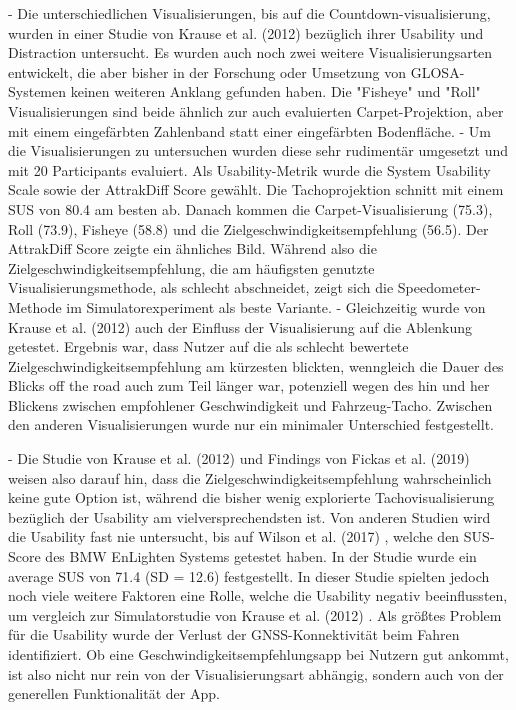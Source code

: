 - Die unterschiedlichen Visualisierungen, bis auf die Countdown-visualisierung, wurden in einer Studie von Krause et al. (2012) \cite{krause_traffic_2012} bezüglich ihrer Usability und Distraction untersucht. Es wurden auch noch zwei weitere Visualisierungsarten entwickelt, die aber bisher in der Forschung oder Umsetzung von GLOSA-Systemen keinen weiteren Anklang gefunden haben. Die "Fisheye" und "Roll" Visualisierungen sind beide ähnlich zur auch evaluierten Carpet-Projektion, aber mit einem eingefärbten Zahlenband statt einer eingefärbten Bodenfläche.
- Um die Visualisierungen zu untersuchen wurden diese sehr rudimentär umgesetzt und mit 20 Participants evaluiert. Als Usability-Metrik wurde die System Usability Scale sowie der AttrakDiff Score gewählt. Die Tachoprojektion schnitt mit einem SUS von 80.4 am besten ab. Danach kommen die Carpet-Visualisierung (75.3), Roll (73.9), Fisheye (58.8) und die Zielgeschwindigkeitsempfehlung (56.5). Der AttrakDiff Score zeigte ein ähnliches Bild. Während also die Zielgeschwindigkeitsempfehlung, die am häufigsten genutzte Visualisierungsmethode, als schlecht abschneidet, zeigt sich die Speedometer-Methode im Simulatorexperiment als beste Variante.
- Gleichzeitig wurde von Krause et al. (2012) \cite{krause_traffic_2012} auch der Einfluss der Visualisierung auf die Ablenkung getestet. Ergebnis war, dass Nutzer auf die als schlecht bewertete Zielgeschwindigkeitsempfehlung am kürzesten blickten, wenngleich die Dauer des Blicks off the road auch zum Teil länger war, potenziell wegen des hin und her Blickens zwischen empfohlener Geschwindigkeit und Fahrzeug-Tacho. Zwischen den anderen Visualisierungen wurde nur ein minimaler Unterschied festgestellt.

- Die Studie von Krause et al. (2012) \cite{krause_traffic_2012} und Findings von Fickas et al. (2019) \cite{fickas_fast_2019} weisen also darauf hin, dass die Zielgeschwindigkeitsempfehlung wahrscheinlich keine gute Option ist, während die bisher wenig explorierte Tachovisualisierung bezüglich der Usability am vielversprechendsten ist. Von anderen Studien wird die Usability fast nie untersucht, bis auf Wilson et al. (2017) \cite{wilson_driver_2017}, welche den SUS-Score des BMW EnLighten Systems getestet haben. In der Studie wurde ein average SUS von 71.4 (SD = 12.6) festgestellt. In dieser Studie spielten jedoch noch viele weitere Faktoren eine Rolle, welche die Usability negativ beeinflussten, um vergleich zur Simulatorstudie von Krause et al. (2012) \cite{krause_traffic_2012}. Als größtes Problem für die Usability wurde der Verlust der GNSS-Konnektivität beim Fahren identifiziert. Ob eine Geschwindigkeitsempfehlungsapp bei Nutzern gut ankommt, ist also nicht nur rein von der Visualisierungsart abhängig, sondern auch von der generellen Funktionalität der App.

